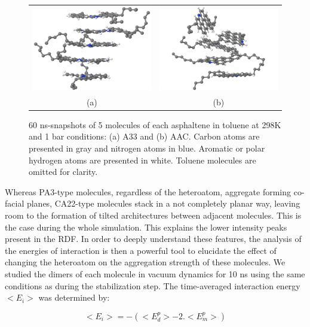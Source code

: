 \begin{figure}[h]
	\begin{tabular}{cc}
		\includegraphics[width=0.45\columnwidth]{image/A33_60ns} & 	
		\includegraphics[width=0.45\columnwidth]{image/AAC_60ns} \\
		(a) & (b) \\
	\end{tabular}
	\caption{60 ns-snapshots of 5 molecules of each asphaltene in toluene at 298K and 1 bar conditions: (a) A33 and (b) AAC. Carbon atoms are presented in gray and nitrogen atoms in blue. Aromatic or polar hydrogen atoms are presented in white. Toluene molecules are omitted for clarity.}
	\label{pap:fig19}
\end{figure}

Whereas PA3-type molecules, regardless of the heteroatom, aggregate forming co-facial planes, CA22-type molecules stack in a not completely planar way, leaving room to the formation of tilted architectures between adjacent molecules. This is the case during the whole simulation. This explains the lower intensity peaks present in the RDF. In order to deeply understand these features, the analysis of the energies of interaction is then a powerful tool to elucidate the effect of changing the heteroatom on the aggregation strength of these molecules. We studied the dimers of each molecule in vacuum dynamics for 10 ns using the same conditions as during the stabilization step. The time-averaged interaction energy $<E_i>$ was determined by:  

\begin{equation}
<E_i>=-(<E^p_d> - 2.<E^p_m>)
\end{equation}

